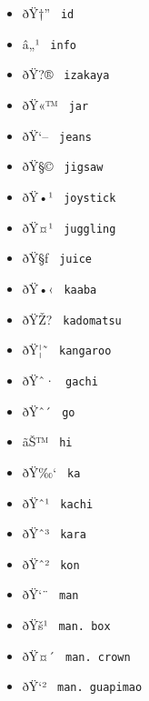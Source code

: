 \begin{itemize}
\item
  \label{symbol-id}{{ ðŸ†'' } \texttt{\ id\ }}
\item
  \label{symbol-info}{{ â„¹ } \texttt{\ info\ }}
\item
  \label{symbol-izakaya}{{ ðŸ?® } \texttt{\ izakaya\ }}
\item
  \label{symbol-jar}{{ ðŸ«™ } \texttt{\ jar\ }}
\item
  \label{symbol-jeans}{{ ðŸ`-- } \texttt{\ jeans\ }}
\item
  \label{symbol-jigsaw}{{ ðŸ§© } \texttt{\ jigsaw\ }}
\item
  \label{symbol-joystick}{{ ðŸ•¹ } \texttt{\ joystick\ }}
\item
  \label{symbol-juggling}{{ ðŸ¤¹ } \texttt{\ juggling\ }}
\item
  \label{symbol-juice}{{ ðŸ§ƒ } \texttt{\ juice\ }}
\item
  \label{symbol-kaaba}{{ ðŸ•‹ } \texttt{\ kaaba\ }}
\item
  \label{symbol-kadomatsu}{{ ðŸŽ? }
  \texttt{\ kadomatsu\ }}
\item
  \label{symbol-kangaroo}{{ ðŸ¦˜ } \texttt{\ kangaroo\ }}
\item
  \label{symbol-gachi}{{ ðŸˆ· } \texttt{\ gachi\ }}
\item
  \label{symbol-go}{{ ðŸˆ´ } \texttt{\ go\ }}
\item
  \label{symbol-hi}{{ ãŠ™ } \texttt{\ hi\ }}
\item
  \label{symbol-ka}{{ ðŸ‰` } \texttt{\ ka\ }}
\item
  \label{symbol-kachi}{{ ðŸˆ¹ } \texttt{\ kachi\ }}
\item
  \label{symbol-kara}{{ ðŸˆ³ } \texttt{\ kara\ }}
\item
  \label{symbol-kon}{{ ðŸˆ² } \texttt{\ kon\ }}
\item
  \label{symbol-man}{{ ðŸ`¨ } \texttt{\ man\ }}
\item
  \label{symbol-man.box}{{ ðŸš¹ } \texttt{\ man.\ box\ }}
\item
  \label{symbol-man.crown}{{ ðŸ¤´ }
  \texttt{\ man.\ crown\ }}
\item
  \label{symbol-man.guapimao}{{ ðŸ`² }
  \texttt{\ man.\ guapimao\ }}

\end{itemize}
